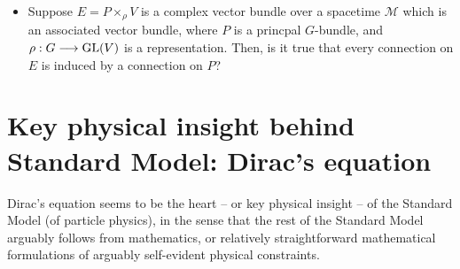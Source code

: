\begin{itemize}
\item
	Suppose $E = P \times_{\rho}V$ is a complex vector bundle over a spacetime $\mathcal{M}$
	which is an associated vector bundle, where $P$ is a princpal $G$-bundle, and
	$\rho : G \longrightarrow \textnormal{GL}(V)$ is a representation.
	Then, is it true that every connection on $E$ is induced by a connection on $P$?
\end{itemize}


\section{Key physical insight behind Standard Model: Dirac's equation}
Dirac's equation seems to be the heart -- or key physical insight -- of the Standard Model (of particle physics),
in the sense that the rest of the Standard Model arguably follows from mathematics, or relatively straightforward
mathematical formulations of arguably self-evident physical constraints.

